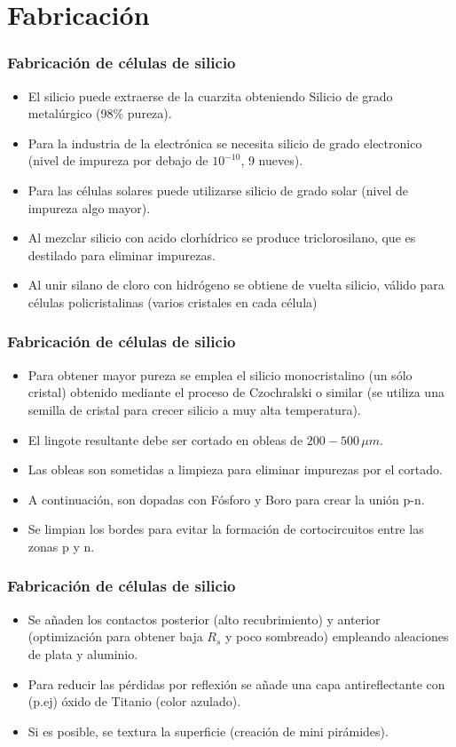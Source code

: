 \documentclass[xcolor=dvipsnames]{beamer}
\begin{document}
\section{Fabricación}

\begin{frame}
  \frametitle{Fabricación de células de silicio}
  \begin{itemize}
  \item El silicio puede extraerse de la cuarzita obteniendo Silicio
    de grado metalúrgico (98\% pureza).
  \item Para la industria de la electrónica se necesita silicio de
    grado electronico (nivel de impureza por debajo de $10^{-10}$, 9
    nueves).
  \item Para las células solares puede utilizarse silicio de grado
    solar (nivel de impureza algo mayor).
  \item Al mezclar silicio con acido clorhídrico se produce
    triclorosilano, que es destilado para eliminar impurezas.
  \item Al unir silano de cloro con hidrógeno se obtiene de vuelta
    silicio, válido para células policristalinas (varios cristales en
    cada célula)
  \end{itemize}

\end{frame}

\begin{frame}
  \frametitle{Fabricación de células de silicio}
  \begin{itemize}
  \item Para obtener mayor pureza se emplea el silicio monocristalino
    (un sólo cristal) obtenido mediante el proceso de Czochralski o
    similar (se utiliza una semilla de cristal para crecer silicio a
    muy alta temperatura).
  \item El lingote resultante debe ser cortado en obleas de
    $200-500\,\mu m$.
  \item Las obleas son sometidas a limpieza para eliminar impurezas
    por el cortado.
  \item A continuación, son dopadas con Fósforo y Boro para crear la
    unión p-n.
  \item Se limpian los bordes para evitar la formación de
    cortocircuitos entre las zonas p y n.
  \end{itemize}

\end{frame}

\begin{frame}
  \frametitle{Fabricación de células de silicio}
  \begin{itemize}
  \item Se añaden los contactos posterior (alto recubrimiento) y
    anterior (optimización para obtener baja $R_{s}$ y poco sombreado)
    empleando aleaciones de plata y aluminio.
  \item Para reducir las pérdidas por reflexión se añade una capa
    antireflectante con (p.ej) óxido de Titanio (color azulado).
  \item Si es posible, se textura la superficie (creación de mini
    pirámides).
  \end{itemize}

\end{frame}
\end{document}
